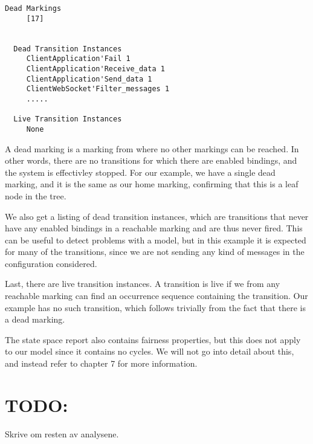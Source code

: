	\begin{lstlisting}[language={}]
  Dead Markings
     [17]


  Dead Transition Instances
     ClientApplication'Fail 1
     ClientApplication'Receive_data 1
     ClientApplication'Send_data 1
     ClientWebSocket'Filter_messages 1
     .....

  Live Transition Instances
     None
	\end{lstlisting}
	
	A dead marking is a marking from where no other markings can be reached.
	 In other words, there are no transitions
	for which there are enabled bindings, and the system is effectivley stopped.
	For our example, we have a single dead marking, and it is the same as our home
	marking, confirming that this is a leaf node in the tree.
	
	We also get a listing of dead transition instances, which are transitions that
	never have any enabled bindings in a reachable marking and are thus never
	fired. This can be useful to detect problems with a model, but in this example
	it is expected for many of the transitions, since we are not sending any kind
	of messages in the configuration considered.
	
	Last, there are live transition instances. A transition is live if we from any
	reachable marking can find an occurrence sequence containing the transition.
	Our example has no such transition, which follows trivially from the fact that
	there is a dead marking.

	The state space report also contains fairness properties, but this does
	not apply to our model since it contains no cycles. We will not go into detail
	about this, and instead refer to \cite{cpn_book} chapter 7 for more
	information.
	
\section{TODO:} 
Skrive om resten av analysene.
